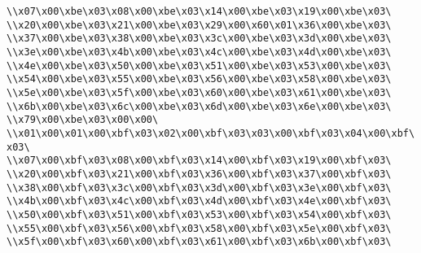 \verb|\\x07\x00\xbe\x03\x08\x00\xbe\x03\x14\x00\xbe\x03\x19\x00\xbe\x03\|\newline
\verb|\\x20\x00\xbe\x03\x21\x00\xbe\x03\x29\x00\x60\x01\x36\x00\xbe\x03\|\newline
\verb|\\x37\x00\xbe\x03\x38\x00\xbe\x03\x3c\x00\xbe\x03\x3d\x00\xbe\x03\|\newline
\verb|\\x3e\x00\xbe\x03\x4b\x00\xbe\x03\x4c\x00\xbe\x03\x4d\x00\xbe\x03\|\newline
\verb|\\x4e\x00\xbe\x03\x50\x00\xbe\x03\x51\x00\xbe\x03\x53\x00\xbe\x03\|\newline
\verb|\\x54\x00\xbe\x03\x55\x00\xbe\x03\x56\x00\xbe\x03\x58\x00\xbe\x03\|\newline
\verb|\\x5e\x00\xbe\x03\x5f\x00\xbe\x03\x60\x00\xbe\x03\x61\x00\xbe\x03\|\newline
\verb|\\x6b\x00\xbe\x03\x6c\x00\xbe\x03\x6d\x00\xbe\x03\x6e\x00\xbe\x03\|\newline
\verb|\\x79\x00\xbe\x03\x00\x00\|\newline
\verb|\\x01\x00\x01\x00\xbf\x03\x02\x00\xbf\x03\x03\x00\xbf\x03\x04\x00\xbf\x03\|\newline
\verb|\\x07\x00\xbf\x03\x08\x00\xbf\x03\x14\x00\xbf\x03\x19\x00\xbf\x03\|\newline
\verb|\\x20\x00\xbf\x03\x21\x00\xbf\x03\x36\x00\xbf\x03\x37\x00\xbf\x03\|\newline
\verb|\\x38\x00\xbf\x03\x3c\x00\xbf\x03\x3d\x00\xbf\x03\x3e\x00\xbf\x03\|\newline
\verb|\\x4b\x00\xbf\x03\x4c\x00\xbf\x03\x4d\x00\xbf\x03\x4e\x00\xbf\x03\|\newline
\verb|\\x50\x00\xbf\x03\x51\x00\xbf\x03\x53\x00\xbf\x03\x54\x00\xbf\x03\|\newline
\verb|\\x55\x00\xbf\x03\x56\x00\xbf\x03\x58\x00\xbf\x03\x5e\x00\xbf\x03\|\newline
\verb|\\x5f\x00\xbf\x03\x60\x00\xbf\x03\x61\x00\xbf\x03\x6b\x00\xbf\x03\|\newline
